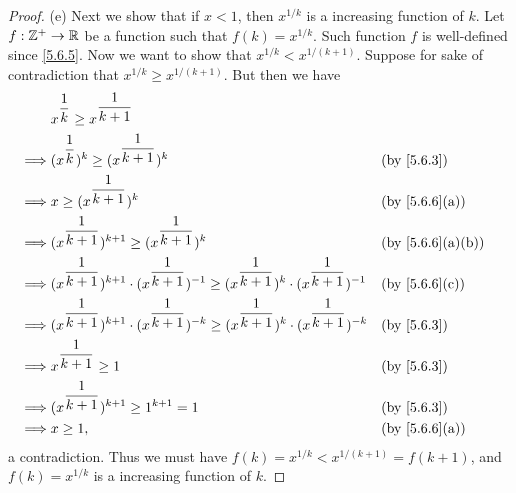 \begin{proof}{(e)}
  Next we show that if \(x < 1\), then \(x^{1 / k}\) is a increasing function of \(k\).
  Let \(f : \mathbb{Z}^+ \to \mathbb{R}\) be a function such that \(f(k) = x^{1 / k}\).
  Such function \(f\) is well-defined since \cref{5.6.5}.
  Now we want to show that \(x^{1 / k} < x^{1 / (k + 1)}\).
  Suppose for sake of contradiction that \(x^{1 / k} \geq x^{1 / (k + 1)}\).
  But then we have
  \begin{align*}
             & x^{\dfrac{1}{k}} \geq x^{\dfrac{1}{k + 1}}                                                                                                                           \\
    \implies & (x^{\dfrac{1}{k}})^k \geq (x^{\dfrac{1}{k + 1}})^k                                                                               &  & \by{5.6.3}                     \\
    \implies & x \geq (x^{\dfrac{1}{k + 1}})^k                                                                                                  &  & \text{(by \cref{5.6.6}(a))}    \\
    \implies & (x^{\dfrac{1}{k + 1}})^{k + 1} \geq (x^{\dfrac{1}{k + 1}})^k                                                                     &  & \text{(by \cref{5.6.6}(a)(b))} \\
    \implies & (x^{\dfrac{1}{k + 1}})^{k + 1} \cdot (x^{\dfrac{1}{k + 1}})^{-1} \geq (x^{\dfrac{1}{k + 1}})^k \cdot (x^{\dfrac{1}{k + 1}})^{-1} &  & \text{(by \cref{5.6.6}(c))}    \\
    \implies & (x^{\dfrac{1}{k + 1}})^{k + 1} \cdot (x^{\dfrac{1}{k + 1}})^{-k} \geq (x^{\dfrac{1}{k + 1}})^k \cdot (x^{\dfrac{1}{k + 1}})^{-k} &  & \by{5.6.3}                     \\
    \implies & x^{\dfrac{1}{k + 1}} \geq 1                                                                                                      &  & \by{5.6.3}                     \\
    \implies & (x^{\dfrac{1}{k + 1}})^{k + 1} \geq 1^{k + 1} = 1                                                                                &  & \by{5.6.3}                     \\
    \implies & x \geq 1,                                                                                                                        &  & \text{(by \cref{5.6.6}(a))}
  \end{align*}
  a contradiction.
  Thus we must have \(f(k) = x^{1 / k} < x^{1 / (k + 1)} = f(k + 1)\), and \(f(k) = x^{1 / k}\) is a increasing function of \(k\).


\end{proof}
